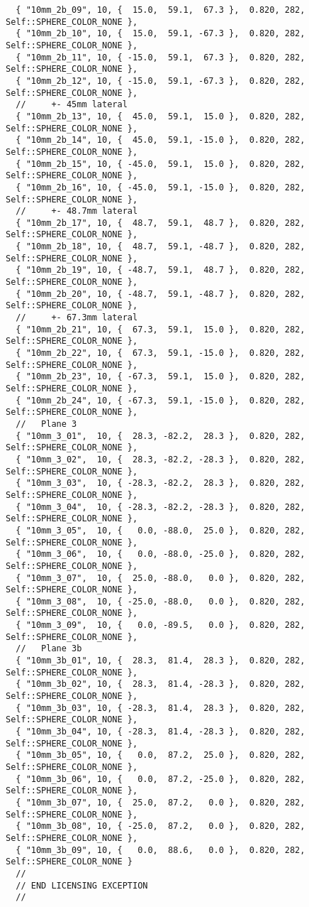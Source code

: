 \documentclass{InsightArticle}
\begin{document}
{\begin{verbatim}
  { "10mm_2b_09", 10, {  15.0,  59.1,  67.3 },  0.820, 282, Self::SPHERE_COLOR_NONE },
  { "10mm_2b_10", 10, {  15.0,  59.1, -67.3 },  0.820, 282, Self::SPHERE_COLOR_NONE },
  { "10mm_2b_11", 10, { -15.0,  59.1,  67.3 },  0.820, 282, Self::SPHERE_COLOR_NONE },
  { "10mm_2b_12", 10, { -15.0,  59.1, -67.3 },  0.820, 282, Self::SPHERE_COLOR_NONE },
  //     +- 45mm lateral
  { "10mm_2b_13", 10, {  45.0,  59.1,  15.0 },  0.820, 282, Self::SPHERE_COLOR_NONE },
  { "10mm_2b_14", 10, {  45.0,  59.1, -15.0 },  0.820, 282, Self::SPHERE_COLOR_NONE },
  { "10mm_2b_15", 10, { -45.0,  59.1,  15.0 },  0.820, 282, Self::SPHERE_COLOR_NONE },
  { "10mm_2b_16", 10, { -45.0,  59.1, -15.0 },  0.820, 282, Self::SPHERE_COLOR_NONE },
  //     +- 48.7mm lateral
  { "10mm_2b_17", 10, {  48.7,  59.1,  48.7 },  0.820, 282, Self::SPHERE_COLOR_NONE },
  { "10mm_2b_18", 10, {  48.7,  59.1, -48.7 },  0.820, 282, Self::SPHERE_COLOR_NONE },
  { "10mm_2b_19", 10, { -48.7,  59.1,  48.7 },  0.820, 282, Self::SPHERE_COLOR_NONE },
  { "10mm_2b_20", 10, { -48.7,  59.1, -48.7 },  0.820, 282, Self::SPHERE_COLOR_NONE },
  //     +- 67.3mm lateral
  { "10mm_2b_21", 10, {  67.3,  59.1,  15.0 },  0.820, 282, Self::SPHERE_COLOR_NONE },
  { "10mm_2b_22", 10, {  67.3,  59.1, -15.0 },  0.820, 282, Self::SPHERE_COLOR_NONE },
  { "10mm_2b_23", 10, { -67.3,  59.1,  15.0 },  0.820, 282, Self::SPHERE_COLOR_NONE },
  { "10mm_2b_24", 10, { -67.3,  59.1, -15.0 },  0.820, 282, Self::SPHERE_COLOR_NONE },
  //   Plane 3
  { "10mm_3_01",  10, {  28.3, -82.2,  28.3 },  0.820, 282, Self::SPHERE_COLOR_NONE },
  { "10mm_3_02",  10, {  28.3, -82.2, -28.3 },  0.820, 282, Self::SPHERE_COLOR_NONE },
  { "10mm_3_03",  10, { -28.3, -82.2,  28.3 },  0.820, 282, Self::SPHERE_COLOR_NONE },
  { "10mm_3_04",  10, { -28.3, -82.2, -28.3 },  0.820, 282, Self::SPHERE_COLOR_NONE },
  { "10mm_3_05",  10, {   0.0, -88.0,  25.0 },  0.820, 282, Self::SPHERE_COLOR_NONE },
  { "10mm_3_06",  10, {   0.0, -88.0, -25.0 },  0.820, 282, Self::SPHERE_COLOR_NONE },
  { "10mm_3_07",  10, {  25.0, -88.0,   0.0 },  0.820, 282, Self::SPHERE_COLOR_NONE },
  { "10mm_3_08",  10, { -25.0, -88.0,   0.0 },  0.820, 282, Self::SPHERE_COLOR_NONE },
  { "10mm_3_09",  10, {   0.0, -89.5,   0.0 },  0.820, 282, Self::SPHERE_COLOR_NONE },
  //   Plane 3b
  { "10mm_3b_01", 10, {  28.3,  81.4,  28.3 },  0.820, 282, Self::SPHERE_COLOR_NONE },
  { "10mm_3b_02", 10, {  28.3,  81.4, -28.3 },  0.820, 282, Self::SPHERE_COLOR_NONE },
  { "10mm_3b_03", 10, { -28.3,  81.4,  28.3 },  0.820, 282, Self::SPHERE_COLOR_NONE },
  { "10mm_3b_04", 10, { -28.3,  81.4, -28.3 },  0.820, 282, Self::SPHERE_COLOR_NONE },
  { "10mm_3b_05", 10, {   0.0,  87.2,  25.0 },  0.820, 282, Self::SPHERE_COLOR_NONE },
  { "10mm_3b_06", 10, {   0.0,  87.2, -25.0 },  0.820, 282, Self::SPHERE_COLOR_NONE },
  { "10mm_3b_07", 10, {  25.0,  87.2,   0.0 },  0.820, 282, Self::SPHERE_COLOR_NONE },
  { "10mm_3b_08", 10, { -25.0,  87.2,   0.0 },  0.820, 282, Self::SPHERE_COLOR_NONE },
  { "10mm_3b_09", 10, {   0.0,  88.6,   0.0 },  0.820, 282, Self::SPHERE_COLOR_NONE }
  // 
  // END LICENSING EXCEPTION
  //
\end{verbatim}
}
\end{document}
